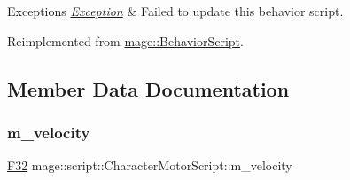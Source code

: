 \begin{DoxyExceptions}{Exceptions}
{\em \hyperlink{classmage_1_1_exception}{Exception}} & Failed to update this behavior script. \\
\hline
\end{DoxyExceptions}


Reimplemented from \hyperlink{classmage_1_1_behavior_script_afb9cf3759edf8876416d1df85489cba6}{mage\+::\+Behavior\+Script}.



\subsection{Member Data Documentation}
\hypertarget{classmage_1_1script_1_1_character_motor_script_a30db45f04bc56380729af037e71ff237}{}\label{classmage_1_1script_1_1_character_motor_script_a30db45f04bc56380729af037e71ff237} 
\subsubsection{\texorpdfstring{m\+\_\+velocity}{m\_velocity}}
{\footnotesize\ttfamily \hyperlink{namespacemage_aa97e833b45f06d60a0a9c4fc22ae02c0}{F32} mage\+::script\+::\+Character\+Motor\+Script\+::m\+\_\+velocity\hspace{0.3cm}{\ttfamily [private]}}

